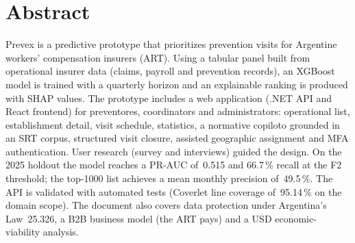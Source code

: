 \chapter*{Abstract}

Prevex is a predictive prototype that prioritizes prevention visits for Argentine workers' compensation insurers (ART).
Using a tabular panel built from operational insurer data (claims, payroll and prevention records), an XGBoost model is trained with a quarterly horizon and an explainable ranking is produced with SHAP values.
The prototype includes a web application (.NET API and React frontend) for preventores, coordinators and administrators: operational list, establishment detail, visit schedule, statistics, a normative copiloto grounded in an SRT corpus, structured visit closure, assisted geographic assignment and MFA authentication.
User research (survey and interviews) guided the design.
On the 2025 holdout the model reaches a PR-AUC of~0.515 and 66.7\,\% recall at the F2 threshold; the top-1000 list achieves a mean monthly precision of~49.5\,\%.
The API is validated with automated tests (Coverlet line coverage of~95.14\,\% on the domain scope).
The document also covers data protection under Argentina's Law~25.326, a B2B business model (the ART pays) and a USD economic-viability analysis.
